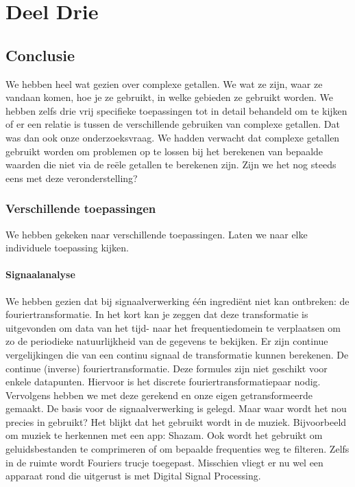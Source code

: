 \documentclass[11pt,fleqn]{book} %
\begin{document}
\part{Deel Drie}


\chapter{Conclusie}
We hebben heel wat gezien over complexe getallen. We wat ze zijn, waar ze vandaan komen, hoe je ze gebruikt, in welke gebieden ze gebruikt worden. We hebben zelfs drie vrij specifieke toepassingen tot in detail behandeld om te kijken of er een relatie is tussen de verschillende gebruiken van complexe getallen.
Dat was dan ook onze onderzoeksvraag. We hadden verwacht dat complexe getallen gebruikt worden om problemen op te lossen bij het berekenen van bepaalde waarden die niet via de reële getallen te berekenen zijn. Zijn we het nog steeds eens met deze veronderstelling?

\section{Verschillende toepassingen}
We hebben gekeken naar verschillende toepassingen. Laten we naar elke individuele toepassing kijken.

\subsection{Signaalanalyse}
We hebben gezien dat bij signaalverwerking één ingrediënt niet kan ontbreken: de fouriertransformatie. In het kort kan je zeggen dat deze transformatie is uitgevonden om data van het tijd- naar het frequentiedomein te verplaatsen om zo de periodieke natuurlijkheid van de gegevens te bekijken. Er zijn continue vergelijkingen die van een continu signaal de transformatie kunnen berekenen. De continue (inverse) fouriertransformatie. Deze formules zijn niet geschikt voor enkele datapunten. Hiervoor is het discrete fouriertransformatiepaar nodig. Vervolgens hebben we met deze gerekend en onze eigen getransformeerde gemaakt.
De basis voor de signaalverwerking is gelegd. Maar waar wordt het nou precies in gebruikt? Het blijkt dat het gebruikt wordt in de muziek. Bijvoorbeeld om muziek te herkennen met een app: Shazam. Ook wordt het gebruikt om geluidsbestanden te comprimeren of om bepaalde frequenties weg te filteren. Zelfs in de ruimte wordt Fouriers trucje toegepast. Misschien vliegt er nu wel een apparaat rond die uitgerust is met Digital Signal Processing.
\end{document}
